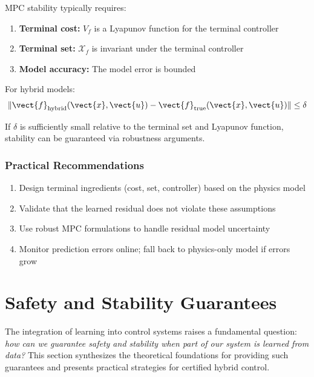 MPC stability typically requires:
\begin{enumerate}
    \item \textbf{Terminal cost:} $V_f$ is a Lyapunov function for the terminal controller
    \item \textbf{Terminal set:} $\mathcal{X}_f$ is invariant under the terminal controller
    \item \textbf{Model accuracy:} The model error is bounded
\end{enumerate}

For hybrid models:
\begin{equation}
\|\vect{f}_{\text{hybrid}}(\vect{x}, \vect{u}) - \vect{f}_{\text{true}}(\vect{x}, \vect{u})\| \leq \delta
\label{eq:model_error_bound}
\end{equation}

If $\delta$ is sufficiently small relative to the terminal set and Lyapunov function, stability can be guaranteed via robustness arguments.

\subsubsection{Practical Recommendations}

\begin{enumerate}
    \item Design terminal ingredients (cost, set, controller) based on the physics model
    \item Validate that the learned residual does not violate these assumptions
    \item Use robust MPC formulations to handle residual model uncertainty
    \item Monitor prediction errors online; fall back to physics-only model if errors grow
\end{enumerate}

\section{Safety and Stability Guarantees}
\label{sec:safety_guarantees}

The integration of learning into control systems raises a fundamental question: \textit{how can we guarantee safety and stability when part of our system is learned from data?} This section synthesizes the theoretical foundations for providing such guarantees and presents practical strategies for certified hybrid control.

